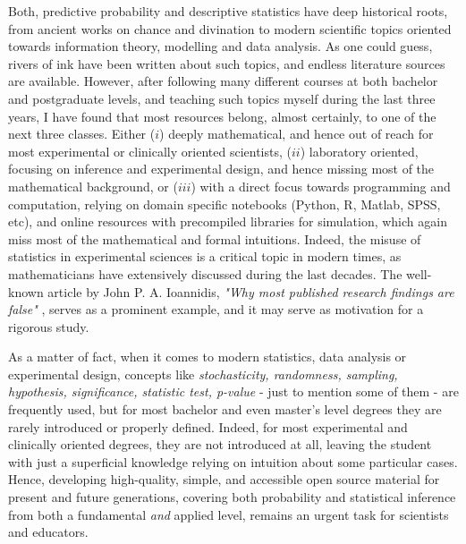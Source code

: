 \documentclass{book}
\begin{document}
\medskip

Both, predictive probability and descriptive statistics have deep historical roots, from ancient works on chance and divination to modern scientific topics oriented towards information theory, modelling and data analysis. As one could guess, rivers of ink have been written about such topics, and endless literature sources are available. However, after following many different courses at both bachelor and postgraduate levels, and teaching such topics myself during the last three years, I have found that most resources belong, almost certainly, to one of the next three classes. Either ($i$) deeply mathematical, and hence out of reach for most experimental or clinically oriented scientists, ($ii$) laboratory oriented, focusing on inference and experimental design, and hence missing most of the mathematical background, or ($iii$) with a direct focus towards programming and computation, relying on domain specific notebooks (Python, R, Matlab, SPSS, etc), and online resources with precompiled libraries for simulation, which again miss most of the mathematical and formal intuitions. Indeed, the misuse of statistics in experimental sciences is a critical topic in modern times, as mathematicians have extensively discussed during the last decades. The well-known article by John P. A. Ioannidis, \textit{"Why most published research findings are false"} \cite{ioannidis2005why}, serves as a prominent example, and it may serve as motivation for a rigorous study.

As a matter of fact, when it comes to modern statistics, data analysis or experimental design, concepts like \textit{stochasticity, randomness, sampling, hypothesis, significance, statistic test, p-value} - just to mention some of them - are frequently used, but for most bachelor and even master's level degrees they are rarely introduced or properly defined. Indeed, for most experimental and clinically oriented degrees, they are not introduced at all, leaving the student with just a superficial knowledge relying on intuition about some particular cases. Hence, developing high-quality, simple, and accessible open source material for present and future generations, covering both probability and statistical inference from both a fundamental \textit{and} applied level, remains an urgent task for scientists and educators.

\medskip
\end{document}
